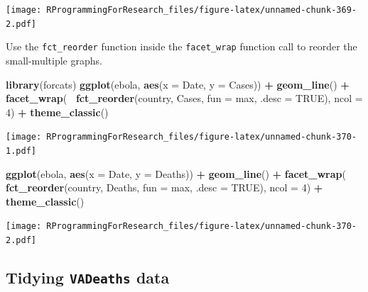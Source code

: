\documentclass[]{book}
\makeatletter
\newenvironment{Shaded}{\begin{snugshade}}{\end{snugshade}}
\newcommand{\KeywordTok}[1]{\textcolor[rgb]{0.13,0.29,0.53}{\textbf{#1}}}
\newcommand{\DataTypeTok}[1]{\textcolor[rgb]{0.13,0.29,0.53}{#1}}
\newcommand{\DecValTok}[1]{\textcolor[rgb]{0.00,0.00,0.81}{#1}}
\newcommand{\StringTok}[1]{\textcolor[rgb]{0.31,0.60,0.02}{#1}}
\newcommand{\OtherTok}[1]{\textcolor[rgb]{0.56,0.35,0.01}{#1}}
\newcommand{\OperatorTok}[1]{\textcolor[rgb]{0.81,0.36,0.00}{\textbf{#1}}}
\newcommand{\NormalTok}[1]{#1}
\newenvironment{kframe}{%
\medskip{}
\setlength{\fboxsep}{.8em}
 \def\at@end@of@kframe{}%
 \ifinner\ifhmode%
  \def\at@end@of@kframe{\end{minipage}}%
  \begin{minipage}{\columnwidth}%
 \fi\fi%
 \def\FrameCommand##1{\hskip\@totalleftmargin \hskip-\fboxsep
 \colorbox{shadecolor}{##1}\hskip-\fboxsep
     \hskip-\linewidth \hskip-\@totalleftmargin \hskip\columnwidth}%
 \MakeFramed {\advance\hsize-\width
   \@totalleftmargin\z@ \linewidth\hsize
   \@setminipage}}%
 {\par\unskip\endMakeFramed%
 \at@end@of@kframe}
\renewenvironment{Shaded}{\begin{kframe}}{\end{kframe}}
\theoremstyle{definition}
\theoremstyle{definition}
\theoremstyle{definition}
\theoremstyle{remark}
\makeatother
\begin{document}
\texttt{[image: RProgrammingForResearch\_files/figure-latex/unnamed-chunk-369-2.pdf]}

Use the \texttt{fct\_reorder} function inside the \texttt{facet\_wrap}
function call to reorder the small-multiple graphs.

\begin{Shaded}
\begin{Highlighting}[]
\KeywordTok{library}\NormalTok{(forcats)}
\KeywordTok{ggplot}\NormalTok{(ebola, }\KeywordTok{aes}\NormalTok{(}\DataTypeTok{x =}\NormalTok{ Date, }\DataTypeTok{y =}\NormalTok{ Cases)) }\OperatorTok{+}\StringTok{ }
\StringTok{        }\KeywordTok{geom_line}\NormalTok{() }\OperatorTok{+}\StringTok{ }
\StringTok{        }\KeywordTok{facet_wrap}\NormalTok{(}\OperatorTok{~}\StringTok{ }\KeywordTok{fct_reorder}\NormalTok{(country, Cases, }\DataTypeTok{fun =}\NormalTok{ max, }\DataTypeTok{.desc =} \OtherTok{TRUE}\NormalTok{),}
                   \DataTypeTok{ncol =} \DecValTok{4}\NormalTok{) }\OperatorTok{+}\StringTok{ }
\StringTok{        }\KeywordTok{theme_classic}\NormalTok{()}
\end{Highlighting}
\end{Shaded}

\texttt{[image: RProgrammingForResearch\_files/figure-latex/unnamed-chunk-370-1.pdf]}

\begin{Shaded}
\begin{Highlighting}[]
\KeywordTok{ggplot}\NormalTok{(ebola, }\KeywordTok{aes}\NormalTok{(}\DataTypeTok{x =}\NormalTok{ Date, }\DataTypeTok{y =}\NormalTok{ Deaths)) }\OperatorTok{+}\StringTok{ }
\StringTok{        }\KeywordTok{geom_line}\NormalTok{() }\OperatorTok{+}\StringTok{ }
\StringTok{        }\KeywordTok{facet_wrap}\NormalTok{(}\OperatorTok{~}\StringTok{ }\KeywordTok{fct_reorder}\NormalTok{(country, Deaths, }\DataTypeTok{fun =}\NormalTok{ max, }\DataTypeTok{.desc =} \OtherTok{TRUE}\NormalTok{),}
                   \DataTypeTok{ncol =} \DecValTok{4}\NormalTok{) }\OperatorTok{+}\StringTok{ }
\StringTok{        }\KeywordTok{theme_classic}\NormalTok{()}
\end{Highlighting}
\end{Shaded}

\texttt{[image: RProgrammingForResearch\_files/figure-latex/unnamed-chunk-370-2.pdf]}

\subsection{\texorpdfstring{Tidying \texttt{VADeaths}
data}{Tidying VADeaths data}}\label{tidying-vadeaths-data}
\end{document}
